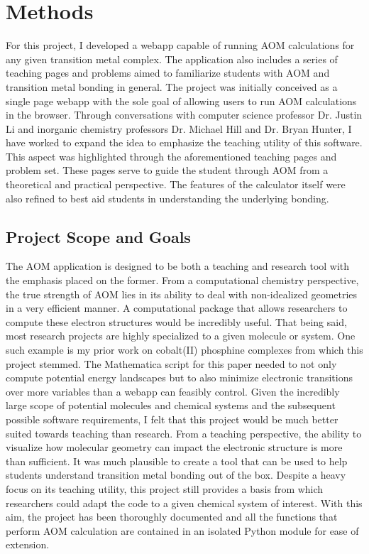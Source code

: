 \documentclass[10pt,twocolumn]{article}
\begin{document}
\section{Methods}
For this project, I developed a webapp capable of running AOM calculations for any given transition metal complex. The application also includes a series of teaching pages and problems aimed to familiarize students with AOM and transition metal bonding in general. The project was initially conceived as a single page webapp with the sole goal of allowing users to run AOM calculations in the browser. Through conversations with computer science professor Dr. Justin Li and inorganic chemistry professors Dr. Michael Hill and Dr. Bryan Hunter, I have worked to expand the idea to emphasize the teaching utility of this software. This aspect was highlighted through the aforementioned teaching pages and problem set. These pages serve to guide the student through AOM from a theoretical and practical perspective. The features of the calculator itself were also refined to best aid students in understanding the underlying bonding.

\subsection{Project Scope and Goals}
The AOM application is designed to be both a teaching and research tool with the emphasis placed on the former. From a computational chemistry perspective, the true strength of AOM lies in its ability to deal with non-idealized geometries in a very efficient manner. A computational package that allows researchers to compute these electron structures would be incredibly useful. That being said, most research projects are highly specialized to a given molecule or system. One such example is my prior work on cobalt(II) phosphine complexes from which this project stemmed. The Mathematica script for this paper needed to not only compute potential energy landscapes but to also minimize electronic transitions over more variables than a webapp can feasibly control. Given the incredibly large scope of potential molecules and chemical systems and the subsequent possible software requirements, I felt that this project would be much better suited towards teaching than research. From a teaching perspective, the ability to visualize how molecular geometry can impact the electronic structure is more than sufficient. It was much plausible to create a tool that can be used to help students understand transition metal bonding out of the box. Despite a heavy focus on its teaching utility, this project still provides a basis from which researchers could adapt the code to a given chemical system of interest. With this aim, the project has been thoroughly documented and all the functions that perform AOM calculation are contained in an isolated Python module for ease of extension.
\end{document}

